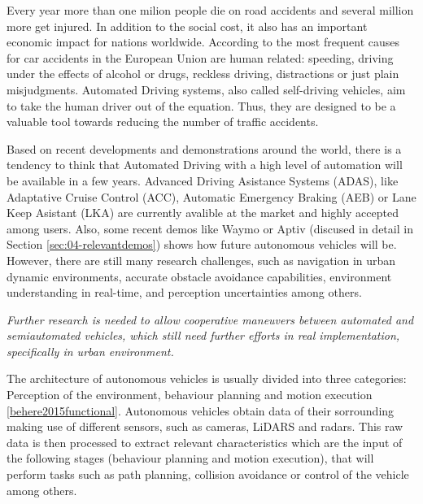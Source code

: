 Every year more than one milion people die on road accidents and several 
million more get injured. In addition to the social cost, it also has an
important economic impact for nations worldwide. According to 
\cite{Thomas2013} the most frequent causes for car accidents in the
European Union are human related: speeding, driving under the effects of
alcohol or drugs, reckless driving, distractions or just plain misjudgments.
Automated Driving systems, also called self-driving vehicles, aim to take the 
human driver out of the equation. Thus, they are designed to be a valuable tool
towards reducing the number of traffic accidents.

Based on recent developments and demonstrations around the world, there is a 
tendency to think that Automated Driving with a high level of automation will 
be available in a few years. 
Advanced Driving Asistance Systems (ADAS), like Adaptative Cruise Control 
(ACC), Automatic Emergency Braking (AEB) or Lane Keep Asistant (LKA) are
currently avalible at the market and highly accepted among users. 
Also, some recent demos like Waymo or Aptiv 
(discused in detail in Section \ref{sec:04-relevantdemos}) shows how future 
autonomous vehicles will be.
However, there are still many research challenges, such as navigation in urban 
dynamic environments, accurate obstacle avoidance capabilities, environment 
understanding in real-time, and perception uncertainties among others.

\emph{Further research is needed to allow cooperative maneuvers between 
automated and semiautomated vehicles, which still need further efforts in
    real implementation, specifically in urban environment.}

The architecture of autonomous vehicles is usually divided into three 
categories: Perception of the environment, behaviour planning and motion 
execution \ref{behere2015functional}. Autonomous 
vehicles obtain data of their sorrounding making use 
of different sensors, such as cameras, LiDARS and radars. This raw data is then 
processed to extract relevant characteristics which are the input of the 
following stages (behaviour planning and motion execution), that will 
perform tasks such as path planning, collision avoidance or control of the 
vehicle among others. 

